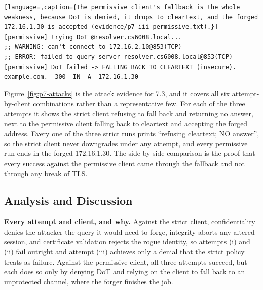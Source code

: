 \documentclass[11pt]{article}
\begin{document}
\begin{lstlisting}[language=,caption={The permissive client's fallback is the whole weakness, because DoT is denied, it drops to cleartext, and the forged 172.16.1.30 is accepted (evidence/p7-iii-permissive.txt).}]
[permissive] trying DoT @resolver.cs6008.local...
;; WARNING: can't connect to 172.16.2.10@853(TCP)
;; ERROR: failed to query server resolver.cs6008.local@853(TCP)
[permissive] DoT failed -> FALLING BACK TO CLEARTEXT (insecure).
example.com.  300  IN  A  172.16.1.30
\end{lstlisting}


Figure~\ref{fig:p7-attacks} is the attack evidence for 7.3, and
it covers all six attempt-by-client combinations rather than a representative few.
For each of the three attempts it shows the strict client refusing to fall
back and returning no answer, next to the permissive client falling back to
cleartext and accepting the forged address. Every one of the three strict runs
prints ``refusing cleartext; NO answer'', so the strict client never downgrades
under any attempt, and every permissive run ends in the forged 172.16.1.30. The
side-by-side comparison is the proof that every success against the permissive
client came through the fallback and not through any break of TLS.

\subsection{Analysis and Discussion}

\textbf{Every attempt and client, and why.} Against the strict client,
confidentiality denies the attacker the query it would need to forge, integrity
aborts any altered session, and certificate validation rejects the rogue identity,
so attempts (i) and (ii) fail outright and attempt (iii) achieves only a denial
that the strict policy treats as failure. Against the permissive client, all three
attempts succeed, but each does so only by denying DoT and relying on the client to
fall back to an unprotected channel, where the forger finishes the job.
\end{document}
